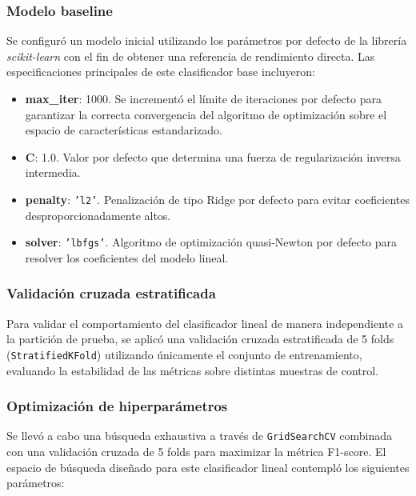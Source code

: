 \subsubsection*{Modelo baseline}

Se configuró un modelo inicial utilizando los parámetros por defecto de la librería \textit{scikit-learn} con el fin de obtener una referencia de rendimiento directa. Las especificaciones principales de este clasificador base incluyeron:

\begin{itemize}
    \item \textbf{max\_iter}: 1000. Se incrementó el límite de iteraciones por defecto para garantizar la correcta convergencia del algoritmo de optimización sobre el espacio de características estandarizado.
    \item \textbf{C}: 1.0. Valor por defecto que determina una fuerza de regularización inversa intermedia.
    \item \textbf{penalty}: \texttt{'l2'}. Penalización de tipo Ridge por defecto para evitar coeficientes desproporcionadamente altos.
    \item \textbf{solver}: \texttt{'lbfgs'}. Algoritmo de optimización quasi-Newton por defecto para resolver los coeficientes del modelo lineal.
\end{itemize}

\subsubsection*{Validación cruzada estratificada}

Para validar el comportamiento del clasificador lineal de manera independiente a la partición de prueba, se aplicó una validación cruzada estratificada de 5 folds (\texttt{StratifiedKFold}) utilizando únicamente el conjunto de entrenamiento, evaluando la estabilidad de las métricas sobre distintas muestras de control.

\subsubsection*{Optimización de hiperparámetros}

Se llevó a cabo una búsqueda exhaustiva a través de \texttt{GridSearchCV} combinada con una validación cruzada de 5 folds para maximizar la métrica F1-score. El espacio de búsqueda diseñado para este clasificador lineal contempló los siguientes parámetros:

